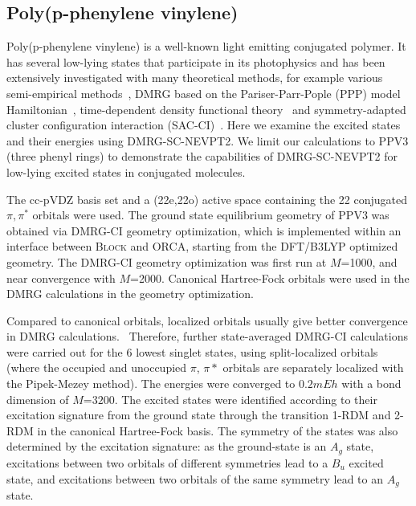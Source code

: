 \subsection{Poly(p-phenylene vinylene)}

Poly(p-phenylene vinylene) is a well-known light emitting conjugated polymer. It has several low-lying states that participate in its photophysics 
and has been extensively investigated with many theoretical methods, for example various semi-empirical methods~\cite{beljonne_theoretical_1995}, DMRG based on the Pariser-Parr-Pople (PPP) model Hamiltonian~\cite{lavrentiev_theoretical_1999,shukla_correlated_2002,bursill_symmetry-adapted_2009}, time-dependent density functional theory~\cite{han_time-dependent_2004} and symmetry-adapted cluster configuration interaction (SAC-CI)~\cite{saha_investigation_2007}. 
Here we examine the excited states and their energies using DMRG-SC-NEVPT2.
We limit our calculations to PPV3 (three phenyl rings) to demonstrate the capabilities of DMRG-SC-NEVPT2 for low-lying excited states in conjugated molecules.

The cc-pVDZ basis set and a (22e,22o) active space containing the 22 conjugated $\pi, \pi^*$ orbitals were used. The ground state equilibrium geometry of PPV3 was obtained via DMRG-CI geometry optimization\cite{hu_excited-state_2015}, which is implemented within an interface between \textsc{Block} and \textsc{ORCA}\cite{neese_orca_2012}, starting from the DFT/B3LYP optimized geometry. The DMRG-CI geometry optimization was first run at $M$=1000, and near convergence with $M$=2000. Canonical Hartree-Fock orbitals were used 
in the DMRG calculations in the geometry optimization.

Compared to canonical orbitals, localized orbitals usually give better convergence in DMRG calculations.~\cite{olivares-amaya_ab-initio_2015} Therefore, further state-averaged DMRG-CI calculations were carried out for the 6 lowest singlet states, using split-localized orbitals (where the occupied and unoccupied $\pi$, $\pi*$ orbitals are separately localized with the Pipek-Mezey method\cite{pipek_fast_1989}). The energies were converged to $0.2mEh$ with a bond dimension of $M$=$3200$. The excited states were identified according to their excitation signature from the ground state through the transition 1-RDM and 2-RDM
in the canonical Hartree-Fock basis. The symmetry of the states was also determined by the excitation signature: as the ground-state
 is an $A_g$ state, excitations between two orbitals of different symmetries lead to a $B_u$ excited state, and excitations between two orbitals of the same symmetry lead to an $A_g$ state.

